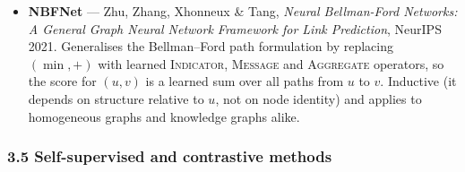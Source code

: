 \begin{itemize}[label=$\bullet$,leftmargin=1.3em]
        a GNN can learn any of the classical heuristics below rather than assuming one.
        The strongest general-purpose link-prediction baseline.
  \item \textbf{NBFNet} --- Zhu, Zhang, Xhonneux \& Tang, \emph{Neural Bellman-Ford
        Networks: A General Graph Neural Network Framework for Link Prediction},
        NeurIPS 2021.
        Generalises the Bellman--Ford path formulation by replacing $(\min,+)$ with learned
        \textsc{Indicator}, \textsc{Message} and \textsc{Aggregate} operators, so the score
        for $(u,v)$ is a learned sum over all paths from $u$ to $v$. Inductive (it depends
        on structure relative to $u$, not on node identity) and applies to homogeneous
        graphs and knowledge graphs alike.
\end{itemize}

\subsubsection*{3.5 Self-supervised and contrastive methods}

